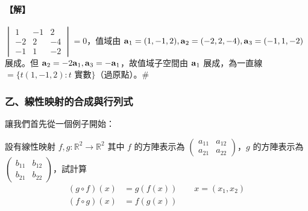 \paragraph{【解】}
$\begin{vmatrix} 1 & -1 & 2 \\ -2 & 2 & -4 \\ -1 & 1 & -2 \end{vmatrix} = 0$，值域由 $\boldsymbol{\mathbf{a}}_1=(1, -1, 2), \boldsymbol{\mathbf{a}}_2=(-2, 2, -4), \boldsymbol{\mathbf{a}}_3=(-1, 1, -2)$ 展成。但 $\boldsymbol{\mathbf{a}}_2 = -2\boldsymbol{\mathbf{a}}_1, \boldsymbol{\mathbf{a}}_3 = -\boldsymbol{\mathbf{a}}_1$，故值域子空間由 $\boldsymbol{\mathbf{a}}_1$ 展成，為一直線 $=\{ t(1, -1, 2) : t \text{ 實數} \}$（過原點）。\hfill$\#$

\subsubsection*{乙、線性映射的合成與行列式}\label{subsec:b6-1-7-b}
\setcounter{example}{0}

讓我們首先從一個例子開始：

\begin{example}\label{ex:b6-1-33}
設有線性映射 $f, g: \mathbb{R}^2 \longrightarrow \mathbb{R}^2$ 其中 $f$ 的方陣表示為 $\begin{pmatrix} a_{11} & a_{12} \\ a_{21} & a_{22} \end{pmatrix}$，$g$ 的方陣表示為 $\begin{pmatrix} b_{11} & b_{12} \\ b_{21} & b_{22} \end{pmatrix}$，試計算
\begin{align*}
(g \circ f)(x) &= g(f(x)) \qquad x=(x_1, x_2) \\
(f \circ g)(x) &= f(g(x))
\end{align*}
\end{example}

